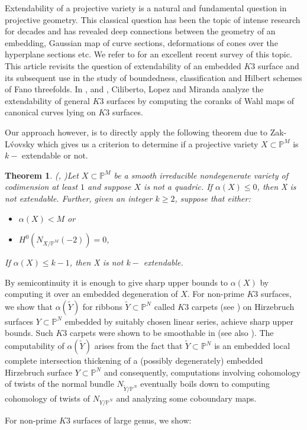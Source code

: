 \documentclass[11pt,twoside]{amsart}
\theoremstyle{plain}
\numberwithin{equation}{section}
\newtheorem{theorem}{Theorem}[section]
\theoremstyle{definition}
\begin{document}
Extendability of a projective variety is a natural and fundamental question in projective geometry. This classical question has been the topic of intense research for decades and has revealed deep connections between the geometry of an embedding, Gaussian map of curve sections, deformations of cones over the hyperplane sections etc. We refer to \cite{Lop23} for an excellent recent survey of this topic. This article revisits the question of extendability of an embedded $K3$ surface and its subsequent use in the study of boundedness, classification and Hilbert schemes of Fano threefolds. In \cite{CLM93}, \cite{CLM94} and \cite{CLM98}, Ciliberto, Lopez and Miranda analyze the extendability of general $K3$ surfaces by computing the coranks of Wahl maps of canonical curves lying on $K3$ surfaces. \par
Our approach however, is to directly apply the following theorem due to Zak-L\'vovsky which gives us a criterion to determine if a projective variety $X \subset \mathbb{P}^M$ is $k-$ extendable or not.

\begin{theorem}(\cite{Lvo92}, \cite{Zak91})\label{ZL}
Let $X \subset \mathbb{P}^{M}$ be a smooth irreducible nondegenerate variety of codimension at least $1$ and suppose $X$ is not a quadric. If $\alpha(X) \leq 0$, then X is not extendable. Further, given an integer $k \geq 2$, suppose that either:
\begin{itemize}
    \item[(1)] $\alpha(X) < M$ or
    \item[(2)] $H^0(N_{X/\mathbb{P}^M}(-2)) = 0$,
\end{itemize}
If $\alpha(X) \leq k-1$, then X is not $k-$ extendable.  

\end{theorem}

By semicontinuity it is enough to give sharp upper bounds to $\alpha(X)$ by computing it over an embedded degeneration of $X$. For non-prime $K3$ surfaces, we show that $\alpha(\widetilde{Y})$ for ribbons $\widetilde{Y} \subset \mathbb{P}^N$ called $K3$ carpets (see ) on Hirzebruch surfaces $Y \subset \mathbb{P}^N$ embedded by suitably chosen linear series, achieve sharp upper bounds. Such $K3$ carpets were shown to be smoothable in \cite{BMR21} (see also \cite{GP97}). The computability of $\alpha(\widetilde{Y})$ arises from the fact that $\widetilde{Y} \subset \mathbb{P}^N$ is an embedded local complete intersection thickening of a (possibly degenerately) embedded Hirzebruch surface $Y \subset \mathbb{P}^N$ and consequently, computations involving cohomology of twists of the normal bundle $N_{\widetilde{Y}/\mathbb{P}^N}$ eventually boils down to computing cohomology of twists of $N_{Y/\mathbb{P}^N}$ and analyzing some coboundary maps. \par
For non-prime $K3$ surfaces of large genus, we show:
\end{document}
